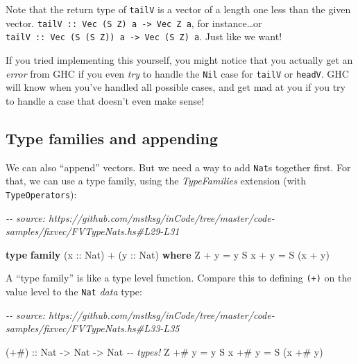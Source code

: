 \documentclass[]{article}
\newenvironment{Shaded}{}{}
\newcommand{\CommentTok}[1]{\textcolor[rgb]{0.38,0.63,0.69}{\textit{#1}}}
\newcommand{\DataTypeTok}[1]{\textcolor[rgb]{0.56,0.13,0.00}{#1}}
\newcommand{\KeywordTok}[1]{\textcolor[rgb]{0.00,0.44,0.13}{\textbf{#1}}}
\newcommand{\NormalTok}[1]{#1}
\newcommand{\OperatorTok}[1]{\textcolor[rgb]{0.40,0.40,0.40}{#1}}
\newcommand{\OtherTok}[1]{\textcolor[rgb]{0.00,0.44,0.13}{#1}}
\begin{document}
Note that the return type of \texttt{tailV} is a vector of a length one less
than the given vector.
\texttt{tailV\ ::\ Vec\ (S\ Z)\ a\ -\textgreater{}\ Vec\ Z\ a}, for
instance\ldots or
\texttt{tailV\ ::\ Vec\ (S\ (S\ Z))\ a\ -\textgreater{}\ Vec\ (S\ Z)\ a}. Just
like we want!

If you tried implementing this yourself, you might notice that you actually get
an \emph{error} from GHC if you even \emph{try} to handle the \texttt{Nil} case
for \texttt{tailV} or \texttt{headV}. GHC will know when you've handled all
possible cases, and get mad at you if you try to handle a case that doesn't even
make sense!

\hypertarget{type-families-and-appending}{%
\subsection{Type families and appending}\label{type-families-and-appending}}

We can also ``append'' vectors. But we need a way to add \texttt{Nat}s together
first. For that, we can use a type family, using the \emph{TypeFamilies}
extension (with \texttt{TypeOperators}):

\begin{Shaded}
\begin{Highlighting}[]
\CommentTok{{-}{-} source: https://github.com/mstksg/inCode/tree/master/code{-}samples/fixvec/FVTypeNats.hs\#L29{-}L31}

\KeywordTok{type} \KeywordTok{family}\NormalTok{ (}\OtherTok{x ::} \DataTypeTok{Nat}\NormalTok{) }\OperatorTok{+}\NormalTok{ (}\OtherTok{y ::} \DataTypeTok{Nat}\NormalTok{) }\KeywordTok{where}
    \DataTypeTok{\textquotesingle{}Z}   \OperatorTok{+}\NormalTok{ y }\OtherTok{=}\NormalTok{ y}
    \DataTypeTok{\textquotesingle{}S}\NormalTok{ x }\OperatorTok{+}\NormalTok{ y }\OtherTok{=} \DataTypeTok{\textquotesingle{}S}\NormalTok{ (x }\OperatorTok{+}\NormalTok{ y)}
\end{Highlighting}
\end{Shaded}

A ``type family'' is like a type level function. Compare this to defining
\texttt{(+)} on the value level to the \texttt{Nat} \emph{data} type:

\begin{Shaded}
\begin{Highlighting}[]
\CommentTok{{-}{-} source: https://github.com/mstksg/inCode/tree/master/code{-}samples/fixvec/FVTypeNats.hs\#L33{-}L35}

\OtherTok{(+\#) ::} \DataTypeTok{Nat} \OtherTok{{-}>} \DataTypeTok{Nat} \OtherTok{{-}>} \DataTypeTok{Nat}       \CommentTok{{-}{-} types!}
\DataTypeTok{Z}   \OperatorTok{+\#}\NormalTok{ y }\OtherTok{=}\NormalTok{ y}
\DataTypeTok{S}\NormalTok{ x }\OperatorTok{+\#}\NormalTok{ y }\OtherTok{=} \DataTypeTok{S}\NormalTok{ (x }\OperatorTok{+\#}\NormalTok{ y)}
\end{Highlighting}
\end{Shaded}
\end{document}
